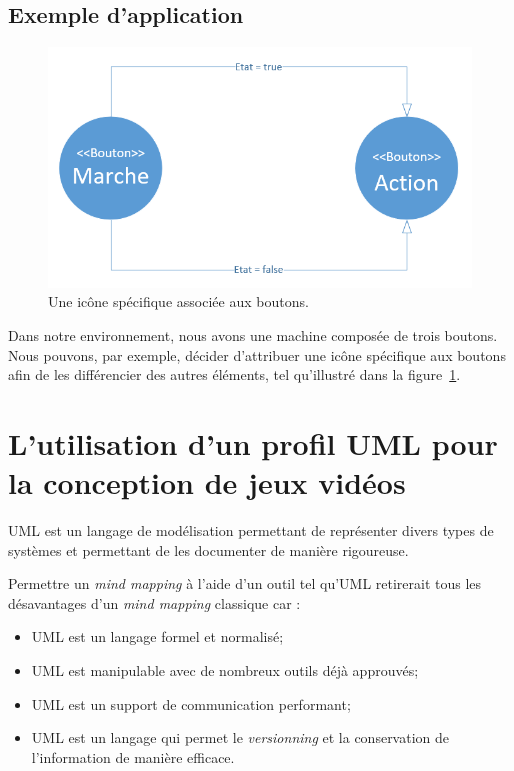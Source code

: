\subsection{Exemple d'application}


\begin{figure}
    \begin{center}
    \includegraphics[width=12cm]{10_img/chap4/img.PNG}
    \caption{Une ic\^one spécifique associ\'ee aux boutons.}
    \label{fig.uml_img}
    \end{center}
\end{figure}

Dans notre environnement, nous avons une machine composée de trois boutons.
Nous pouvons, par exemple, décider d'attribuer une ic\^one spécifique aux boutons afin de les différencier des autres éléments, tel qu'illustr\'e dans la figure~\ref{fig.uml_img}.




\section{L'utilisation d'un profil UML pour la conception de jeux vidéos}


UML est un langage de modélisation permettant de représenter divers types de systèmes et permettant de les documenter de manière rigoureuse.

Permettre un \emph{mind mapping} à l'aide d'un outil tel qu'UML retirerait tous les désavantages d'un \emph{mind mapping} classique car :
\begin{itemize}
    \item UML est un langage formel et normalisé;
    \item UML est manipulable avec de nombreux outils déjà approuvés;
    \item UML est un support de communication performant;
    \item UML est un langage qui permet le \emph{versionning} et la conservation de l'information de manière efficace.
\end{itemize}

